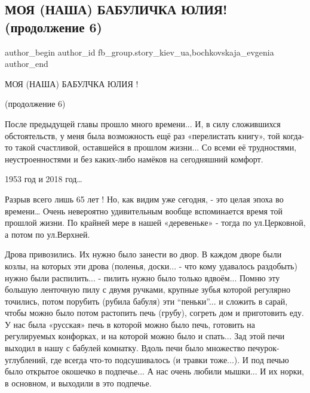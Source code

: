  
 
 
 
 
 
\subsection{МОЯ  (НАША) БАБУЛИЧКА ЮЛИЯ! (продолжение 6)}
\label{sec:31_03_2018.fb.fb_group.story_kiev_ua.1.babulichka_julia_6}
 
\ifcmt
 author_begin
   author_id fb_group.story_kiev_ua,bochkovskaja_evgenia
 author_end
\fi

МОЯ (НАША) БАБУЛЧКА ЮЛИЯ !

(продолжение 6)

После предыдущей главы прошло много времени... И, в силу сложившихся
обстоятельств, у меня была возможность ещё раз «перелистать книгу», той
когда-то такой счастливой, оставшейся в прошлом жизни... Со всеми её трудностями,
неустроенностями и без каких-либо намёков на сегодняшний комфорт. 

1953 год и 2018 год… 

Разрыв всего лишь 65 лет ! Но, как видим уже сегодня, - это целая эпоха во
времени… Очень невероятно удивительным вообще вспоминается время той прошлой
жизни. По крайней мере в нашей «деревеньке» - тогда по ул.Церковной, а потом
по  ул.Верхней. 

Дрова привозились. Их нужно было занести во двор. В каждом дворе были козлы, на
которых эти дрова (поленья, доски... - что кому удавалось раздобыть) нужно были
распилить... - пилить нужно было только вдвоём... Помню эту большую ленточную
пилу с двумя ручками, крупные зубья которой регулярно точились, потом порубить
(рубила бабуля) эти \enquote{пеньки}... и сложить в сарай, чтобы можно было потом
растопить печь (грубу), согреть дом и приготовить еду. У нас была «русская»
печь в которой можно было печь, готовить на регулируемых конфорках, и на
которой можно было и спать... Зад этой печи выходил в нашу с бабулей комнатку.
Вдоль печи было множество печурок-углублений, где всегда что-то подсушивалось
(и травки тоже...). И под печью было открытое окошечко в подпечье... А нас очень
любили мышки... И их норки, в основном, и выходили в это подпечье.

